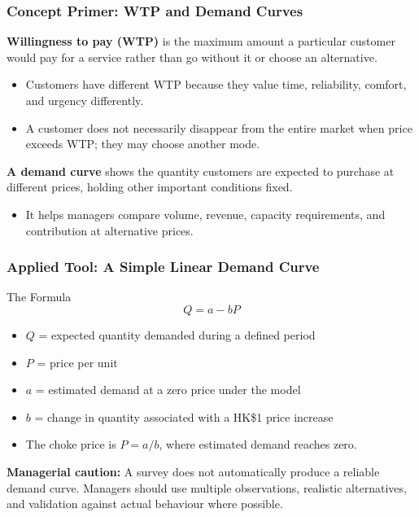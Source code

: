 \documentclass{beamer}
\begin{document}
\begin{frame}[t]
\frametitle{Concept Primer: WTP and Demand Curves}
\textbf{Willingness to pay (WTP)} is the maximum amount a particular customer would pay for a service rather than go without it or choose an alternative.
\begin{itemize}
\item Customers have different WTP because they value time, reliability, comfort, and urgency differently.
\item A customer does not necessarily disappear from the entire market when price exceeds WTP; they may choose another mode.
\end{itemize}
\textbf{A demand curve} shows the quantity customers are expected to purchase at different prices, holding other important conditions fixed.
\begin{itemize}
\item It helps managers compare volume, revenue, capacity requirements, and contribution at alternative prices.
\end{itemize}
\end{frame}


\begin{frame}[t]
\frametitle{Applied Tool: A Simple Linear Demand Curve}
\begin{block}{The Formula}
\[Q=a-bP\]
\end{block}
\begin{itemize}
\item $Q$ = expected quantity demanded during a defined period
\item $P$ = price per unit
\item $a$ = estimated demand at a zero price under the model
\item $b$ = change in quantity associated with a HK\$1 price increase
\item The choke price is $P=a/b$, where estimated demand reaches zero.
\end{itemize}
\textbf{Managerial caution:} A survey does not automatically produce a reliable demand curve. Managers should use multiple observations, realistic alternatives, and validation against actual behaviour where possible.
\end{frame}
\end{document}
